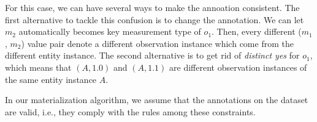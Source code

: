 \documentclass[10pt]{article}
\begin{document}
For this case, we can have several ways to make the annoation
consistent. 
The first alternative to tackle this confusion is to change the
annotation.  We can let $m_2$ automatically becomes key measurement type of
$o_1$. Then, every different ($m_1$, $m_2$) value pair denote a
different observation instance which come from the different entity
instance.
The second alternative is to get rid of {\em distinct yes} for $o_1$,
which means that $(A,1.0)$ and $(A,1.1)$ are different observation instances of the same entity instance
$A$.  



In our materialization algorithm, we assume that the annotations on the dataset are valid, i.e., they comply with the rules among these constraints. 
\end{document}
